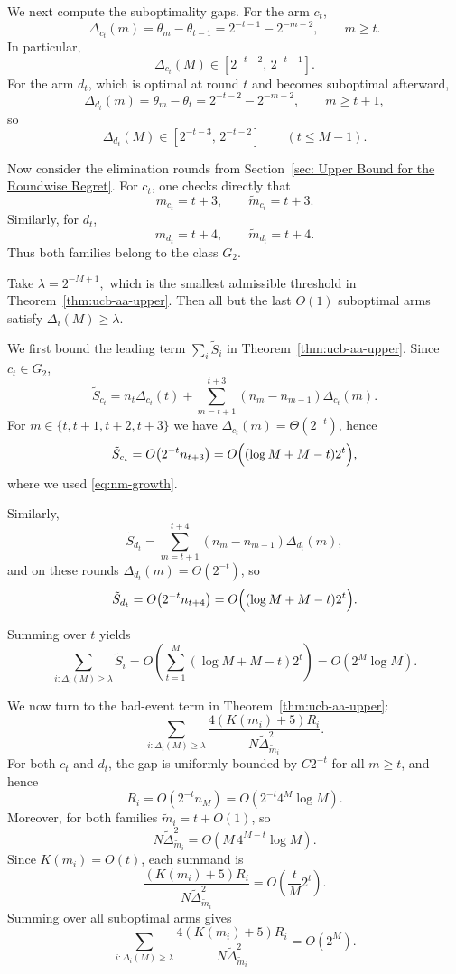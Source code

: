 \documentclass[11pt]{article}
\begin{document}
We next compute the suboptimality gaps. For the arm $c_t$,
\[
\Delta_{c_t}(m)
=
\theta_m-\theta_{t-1}
=
2^{-t-1}-2^{-m-2},
\qquad m\ge t.
\]
In particular,
\[
\Delta_{c_t}(M)\in [2^{-t-2},\,2^{-t-1}].
\]
For the arm $d_t$, which is optimal at round $t$ and becomes suboptimal afterward,
\[
\Delta_{d_t}(m)
=
\theta_m-\theta_t
=
2^{-t-2}-2^{-m-2},
\qquad m\ge t+1,
\]
so
\[
\Delta_{d_t}(M)\in [2^{-t-3},\,2^{-t-2}]
\qquad (t\le M-1).
\]

Now consider the elimination rounds from Section~\ref{sec: Upper Bound for the Roundwise Regret}. For $c_t$, one checks directly that
\[
m_{c_t}=t+3,
\qquad
\tilde m_{c_t}=t+3.
\]
Similarly, for $d_t$,
\[
m_{d_t}=t+4,
\qquad
\tilde m_{d_t}=t+4.
\]
Thus both families belong to the class $G_2$.

Take
\(
\lambda = 2^{-M+1},
\)
which is the smallest admissible threshold in Theorem~\ref{thm:ucb-aa-upper}. Then all but the last $O(1)$
suboptimal arms satisfy $\Delta_i(M)\ge \lambda$.

We first bound the leading term $\sum_i \tilde S_i$ in Theorem~\ref{thm:ucb-aa-upper}.
Since $c_t\in G_2$,
\[
\tilde S_{c_t}
=
n_t\Delta_{c_t}(t)
+
\sum_{m=t+1}^{t+3} (n_m-n_{m-1})\Delta_{c_t}(m).
\]
For $m\in\{t,t+1,t+2,t+3\}$ we have $\Delta_{c_t}(m)=\Theta(2^{-t})$, hence
\[
\tilde S_{c_t}
=
O\bigl(2^{-t}n_{t+3}\bigr)
=
O\Bigl((\log M+M-t)2^t\Bigr),
\]
where we used \eqref{eq:nm-growth}.

Similarly,
\[
\tilde S_{d_t}
=
\sum_{m=t+1}^{t+4} (n_m-n_{m-1})\Delta_{d_t}(m),
\]
and on these rounds $\Delta_{d_t}(m)=\Theta(2^{-t})$, so
\[
\tilde S_{d_t}
=
O\bigl(2^{-t}n_{t+4}\bigr)
=
O\Bigl((\log M+M-t)2^t\Bigr).
\]

Summing over $t$ yields
\begin{equation}
\label{eq:Si-sum}
\sum_{i:\Delta_i(M)\ge\lambda} \tilde S_i
=
O\left(
\sum_{t=1}^{M} (\log M+M-t)2^t
\right)
=
O(2^M\log M).
\end{equation}

We now turn to the bad-event term in Theorem~\ref{thm:ucb-aa-upper}:
\[
\sum_{i:\Delta_i(M)\ge\lambda}
\frac{4(K(m_i)+5)R_i}{N\tilde\Delta_{\tilde m_i}^2}.
\]
For both $c_t$ and $d_t$, the gap is uniformly bounded by $C2^{-t}$ for all $m\ge t$, and
hence
\[
R_i = O(2^{-t}n_M)=O(2^{-t}4^M\log M).
\]
Moreover, for both families $\tilde m_i=t+O(1)$, so
\[
N\tilde\Delta_{\tilde m_i}^2
=
\Theta(M\,4^{M-t}\log M).
\]
Since $K(m_i)=O(t)$, each summand is
\[
\frac{(K(m_i)+5)R_i}{N\tilde\Delta_{\tilde m_i}^2}
=
O\left(\frac{t}{M}2^t\right).
\]
Summing over all suboptimal arms gives
\begin{equation}
\label{eq:bad-term}
\sum_{i:\Delta_i(M)\ge\lambda}
\frac{4(K(m_i)+5)R_i}{N\tilde\Delta_{\tilde m_i}^2}
=
O(2^M).
\end{equation}
\end{document}
